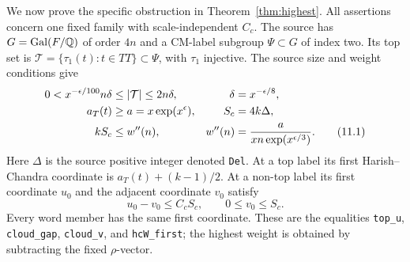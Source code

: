 We now prove the specific obstruction in
Theorem~\ref{thm:highest}. All assertions concern one fixed
family with scale-independent $C_c$. The source has
$G=\operatorname{Gal}(F/\mathbb Q)$ of order $4n$ and a CM-label subgroup
$\Psi\subset G$ of index two. Its top set is
$\mathcal T=\{\tau_1(t):t\in TT\}\subset\Psi$, with
$\tau_1$ injective. The source size and weight conditions give
\begin{align}
 0<x^{-\epsilon/100}n\delta
     &\le |\mathcal T|\le2n\delta,
       &\delta&=x^{-\epsilon/8},\notag\\
 a_T(t)&\ge a=x\exp(x^\epsilon),
       &S_c&=4k\Delta,\notag\\
 kS_c&\le w''(n),
       &w''(n)&=\frac{a}{xn\exp(x^{\epsilon/3})}.
                                                        \tag{11.1}
\end{align}
Here $\Delta$ is the source positive integer denoted
\texttt{Del}. At a top label its first Harish--Chandra
coordinate is $a_T(t)+(k-1)/2$. At a non-top label its first
coordinate $u_0$ and the adjacent coordinate $v_0$ satisfy
\[
     u_0-v_0\le C_cS_c,\qquad 0\le v_0\le S_c.
                                                        \tag{11.2}
\]
Every word member has the same first coordinate. These are the
equalities \texttt{top\_u}, \texttt{cloud\_gap},
\texttt{cloud\_v}, and \texttt{hcW\_first}; the highest
weight is obtained by subtracting the fixed $\rho$-vector.

